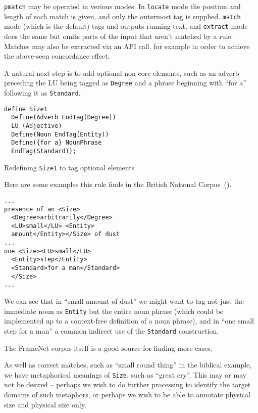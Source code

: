 \documentclass[11pt]{article}
\begin{document}
\verb+pmatch+ may be operated in verious modes. In \verb+locate+ mode the
position and length of each match is given, and only the outermost tag is
supplied. \verb+match+ mode (which is the default) tags and outputs running
text, and \verb+extract+ mode does the same but omits parts of the input that
aren't matched by a rule. Matches may also be extracted via an API call, for
example in order to achieve the above-seen concordance effect.

A natural next step is to add optional non-core elements, such as an adverb
preceding the LU being tagged as \verb+Degree+ and a phrase beginning with
``for a'' following it as \verb+Standard+.

\begin{table}[h]
  \small
  \begin{framed}
\begin{verbatim}
define Size1
  Define(Adverb EndTag(Degree))
  LU (Adjective)
  Define(Noun EndTag(Entity))
  Define({for a} NounPhrase
  EndTag(Standard));
\end{verbatim}
\end{framed}
\normalsize
\caption{Redefining \texttt{Size1} to tag optional elements}
\end{table}

Here are some examples this rule finds in the British National
Corpus~().

  \small
  \begin{framed}
\begin{verbatim}
...
presence of an <Size>
  <Degree>arbitrarily</Degree>
  <LU>small</LU> <Entity>
  amount</Entity></Size> of dust
...
one <Size><LU>small</LU>
  <Entity>step</Entity>
  <Standard>for a man</Standard>
  </Size>
...
\end{verbatim}
  \end{framed}
  \normalsize

We can see that in ``small amount of dust'' we might want to
tag not just the immediate noun as \verb+Entity+ but the entire noun phrase
(which could be implemented up to a context-free definition of a noun phrase),
and in ``one small step for a man'' a common indirect use of the \verb+Standard+
construction.

The FrameNet corpus itself is a
good source for finding more cases.

As well as correct matches, such as ``small round thing'' in the biblical
example, we have metaphorical meanings of \verb+Size+, such as ``great cry''.
This may or may not be desired -- perhaps we wish to do further processing to
identify the target domains of such metaphors, or perhaps we wish to be able
to annotate physical size and physical size only.
\end{document}
